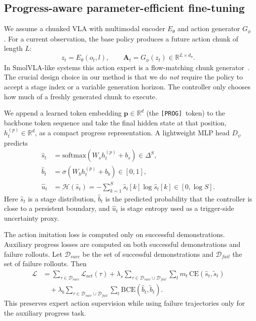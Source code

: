 \documentclass[10pt]{article}
\newcommand{\progtok}{\texttt{[PROG]}}
\newcommand{\Sstages}{S}
\newcommand{\bt}{\tilde{b}_t}
\newcommand{\st}{\tilde{s}_t}
\begin{document}
\subsection{Progress-aware parameter-efficient fine-tuning}
\label{sec:training}

We assume a chunked VLA with multimodal encoder $E_\theta$ and action generator
$G_\phi$.
For a current observation, the base policy produces a future action chunk of
length $L$:
\begin{equation}
  z_t = E_\theta(o_t,l), \qquad
  \mathbf{A}_t = G_\phi(z_t) \in \mathbb{R}^{L \times d_a}.
  \label{eq:basechunk}
\end{equation}
In SmolVLA-like systems this action expert is a flow-matching chunk generator~\cite{msplora}.
The crucial design choice in our method is that we do \emph{not} require the
policy to accept a stage index or a variable generation horizon.
The controller only chooses how much of a freshly generated chunk to execute.

We append a learned token embedding $\mathbf{p}\in\mathbb{R}^d$
(the \progtok\ token) to the backbone token sequence and take the final hidden
state at that position, $h_t^{(p)}\in\mathbb{R}^d$, as a compact progress
representation.
A lightweight MLP head $D_\psi$ predicts
\begin{align}
  \hat s_t &= \mathrm{softmax}(W_s h_t^{(p)} + b_s)
    \in \Delta^{\Sstages},
    \label{eq:head_stage}\\
  \hat b_t &= \sigma(W_b h_t^{(p)} + b_b) \in [0,1],
    \label{eq:head_boundary}\\
  \hat u_t &= \mathcal{H}(\hat s_t)
    = -\sum_{k=1}^{\Sstages} \hat s_t[k] \log \hat s_t[k]
    \in [0,\log \Sstages].
    \label{eq:head_entropy}
\end{align}
Here $\hat s_t$ is a stage distribution, $\hat b_t$ is the predicted probability
that the controller is close to a persistent boundary, and $\hat u_t$ is stage
entropy used as a trigger-side uncertainty proxy.

The action imitation loss is computed only on successful demonstrations.
Auxiliary progress losses are computed on both successful demonstrations and
failure rollouts.
Let $\mathcal{D}_{succ}$ be the set of successful demonstrations and
$\mathcal{D}_{fail}$ the set of failure rollouts.
Then
\begin{align}
  \mathcal{L}
  &= \sum_{\tau\in\mathcal{D}_{succ}} \mathcal{L}_{act}(\tau)
   + \lambda_s \sum_{\tau\in \mathcal{D}_{succ}\cup\mathcal{D}_{fail}}
      \sum_t m_t\, \mathrm{CE}(\hat s_t,\st) \\
  &\quad + \lambda_b \sum_{\tau\in \mathcal{D}_{succ}\cup\mathcal{D}_{fail}}
      \sum_t \mathrm{BCE}(\hat b_t,\bt).
  \label{eq:loss}
\end{align}
This preserves expert action supervision while using failure trajectories only
for the auxiliary progress task.
\end{document}
